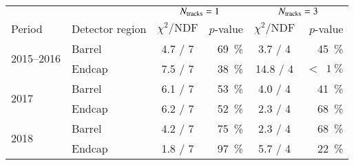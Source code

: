 \begin{tabular}{ll@{\hskip 20pt}cr@{\hskip 10pt}|@{\hskip 10pt}cr}
  \toprule
  & & \multicolumn{2}{c}{$N_{\text{tracks}} = 1$} & \multicolumn{2}{c}{$N_{\text{tracks}} = 3$} \\
  \cmidrule{3-6}
  {Period} & {Detector region} & {$\chi^2 / \text{NDF}$} & {$p$-value} & {$\chi^2 / \text{NDF}$} & {$p$-value} \\
  \midrule
  \multirow{2}{*}{2015--2016} & Barrel & 4.7 / 7 & \SI{69}{\percent} & \phantom{0}3.7 / 4 & \SI{45}{\percent} \\
                              & Endcap & 7.5 / 7 & \SI{38}{\percent} & 14.8 / 4 & $< \phantom{0}\SI{1}{\percent}$ \\[0.5em]
  \multirow{2}{*}{2017}       & Barrel & 6.1 / 7 & \SI{53}{\percent} & \phantom{0}4.0 / 4 & \SI{41}{\percent} \\
                              & Endcap & 6.2 / 7 & \SI{52}{\percent} & \phantom{0}2.3 / 4 & \SI{68}{\percent} \\[0.5em]
  \multirow{2}{*}{2018}       & Barrel & 4.2 / 7 & \SI{75}{\percent} & \phantom{0}2.3 / 4 & \SI{68}{\percent} \\
                              & Endcap & 1.8 / 7 & \SI{97}{\percent} & \phantom{0}5.7 / 4 & \SI{22}{\percent} \\
  \bottomrule
\end{tabular}


